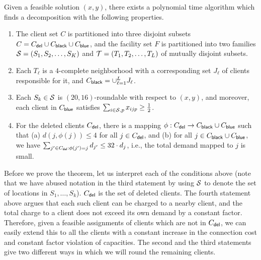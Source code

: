 \begin{theorem}\label{thm:decomp}
	Given a feasible solution $(x,y)$, there exists a polynomial time algorithm which finds a decomposition with the following properties.
	\begin{enumerate}%
		\item The client set $C$ is partitioned into three disjoint subsets $C = C_{\mathsf{del}} \cup C_{\mathsf{black}} \cup C_{\mathsf{blue}}$, and the facility set $F$ is partitioned into two families ${\cal S} = (S_1, S_2, \ldots, S_K)$ and ${\cal T} = (T_1, T_2, \ldots, T_L)$ of mutually disjoint subsets.

\item Each $T_\ell$ is a $4$-complete neighborhood with a corresponding set $J_\ell$ of clients responsible for it, and $C_{\mathsf{black}} = \cup_{\ell = 1}^L J_\ell$.	

		\item Each $S_k \in {\cal S}$ is $(20,16)$-roundable with respect to $(x,y)$, and moreover, each client in $C_{\mathsf{blue}}$ satisfies $\sum_{i \in {\cal S}, p} x_{ijp} \geq \frac12$.

\item For the deleted clients $C_{\mathsf{del}}$, there is a mapping $\phi:C_{\mathsf{del}} \to C_{\mathsf{black}} \cup C_{\mathsf{blue}}$ such that
(a) $d(j,\phi(j)) \leq 4$ for all $j\in C_{\mathsf{del}}$, and
(b)	for all $j\in C_{\mathsf{black}} \cup C_{\mathsf{blue}}$, we have $\sum_{j' \in C_{\mathsf{del}}: \phi(j') = j} d_{j'} \leq 32\cdot d_j$, i.e., the total demand mapped to $j$ is small.

\end{enumerate}
\end{theorem}

Before we prove the theorem, let us interpret each of the conditions above (note that we have abused notation in the third statement by using ${\cal S}$ to
denote the set of locations in $S_1, \ldots, S_k$). $C_{\mathsf{del}}$ is the set of deleted clients. The fourth statement above argues that each such  client can be charged to a nearby client, and  the total charge to a client does not exceed its own demand by a constant factor. Therefore, given a feasible assignments of clients which are not in $C_{\mathsf{del}}$, we can easily extend this to all the clients with a constant increase in the connection cost and constant factor violation of capacities. The second and the third statements give two different ways in which we will round the remaining clients.


